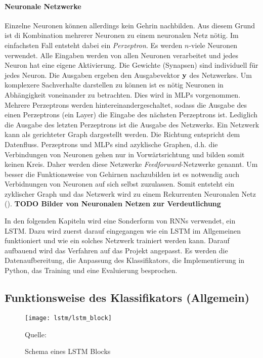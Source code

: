 \paragraph{Neuronale Netzwerke}
Einzelne Neuronen können allerdings kein Gehrin nachbilden. Aus diesem Grund ist
di Kombination mehrerer Neuronen zu einem neuronalen Netz nötig. Im einfachsten
Fall entsteht dabei ein \textit{Perzeptron}. Es werden $n$-viele Neuronen
verwendet. Alle Eingaben werden von allen Neuronen verarbeitet und jedes Neuron
hat eine eigene Aktivierung. Die Gewichte (Synapsen) sind individuell für jedes
Neuron. Die Ausgaben ergeben den Ausgabevektor $\bf{y}$ des Netzwerkes. Um
komplexere Sachverhalte darstellen zu können ist es nötig Neuronen in
Abhängigkeit voneinander zu betrachten. Dies wird in \acp{MLP} vorgenommen.
Mehrere Perzeptrons werden hintereinandergeschaltet, sodass die Ausgabe des
einen Perzeptrons (ein Layer) die Eingabe des nächsten Perzeptrons ist.
Lediglich die Ausgabe des letzten Perzeptrons ist die Ausgabe des Netzwerks. 
Ein Netzwerk kann als gerichteter Graph dargestellt werden. Die Richtung
entspricht dem Datenfluss. Perzeptrons und \acp{MLP} sind azyklische Graphen,
d.h. die Verbindungen von Neuronen gehen nur in Vorwärtsrichtung und bilden
somit keinen Kreis. Daher werden diese Netzwerke \textit{Feedforward}-Netzwerke
genannt. Um besser die Funktionsweise von Gehirnen nachzubilden ist es
notwendig auch Verbidnungen von Neuronen auf sich selbst zuzulassen. Somit
entsteht ein zyklischer Graph und das Netzwerk wird zu einem Rekurrenten
Neuronalen Netz (). 
\textbf{TODO Bilder von Neuronalen Netzen zur Verdeutlichung}

In den folgenden Kapiteln wird eine Sonderform von \acp{RNN} verwendet, ein
\ac{LSTM}. Dazu wird zuerst darauf eingegangen wie ein \ac{LSTM} im
Allgemeinen funktioniert und wie ein solches Netzwerk trainiert werden kann.
Darauf aufbauend wird das Verfahren auf das Projekt angepasst. Es werden die
Datenaufbereitung, die Anpassung des Klassifikators, die Implementierung in
Python, das Training und eine Evaluierung besprochen. 


 
\subsection{Funktionsweise des Klassifikators (Allgemein)}

 
\begin{figure}[htfp]
	\begin{center}
	\texttt{[image: lstm/lstm\_block]}
	\caption{Schema eines \acs{LSTM} Blocks}
	Quelle: \cite{WIKI2013}
	\label{fig:lstm_block}
	\end{center}
\end{figure}


